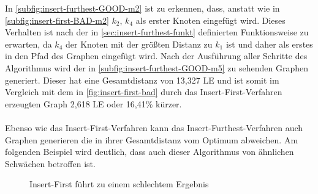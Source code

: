 In \vref{subfig:insert-furthest-GOOD-m2} ist zu erkennen, dass, anstatt wie in \vref{subfig:insert-first-BAD-m2} $k_2$, $k_4$ als erster Knoten eingefügt wird.
Dieses Verhalten ist nach der in \vref{sec:insert-furthest-funkt} definierten Funktionsweise zu erwarten, da $k_4$ der Knoten mit der größten Distanz zu $k_1$ ist und daher als erstes in den Pfad des Graphen eingefügt wird.
Nach der Ausführung aller Schritte des Algorithmus wird der in \vref{subfig:insert-furthest-GOOD-m5} zu sehenden Graphen generiert.
Dieser hat eine Gesamtdistanz von 13,327 \ac{LE} und ist somit im Vergleich mit dem in \vref{fig:insert-first-bad} durch das Insert-First-Verfahren erzeugten Graph 2,618 \ac{LE} oder 16,41\% kürzer.
\\\\
Ebenso wie das Insert-First-Verfahren kann das Insert-Furthest-Verfahren auch Graphen generieren die in ihrer Gesamtdistanz vom Optimum abweichen. Am folgenden Beispiel wird deutlich, dass auch dieser Algorithmus von ähnlichen Schwächen betroffen ist.
\begin{figure}[H]
    \begin{center}
        \hfil
        \caption{Insert-First führt zu einem schlechtem Ergebnis}
        \label{fig:insert-furthest-bad}
    \end{center}
\end{figure}

